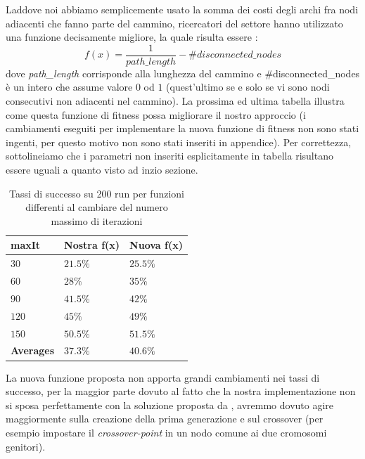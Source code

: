 Laddove noi abbiamo semplicemente usato la somma dei costi degli archi fra nodi adiacenti che fanno parte del cammino, ricercatori del settore hanno utilizzato una funzione decisamente migliore, la quale risulta essere \cite{path2} : $$f(x)=\frac{1}{path\_length}-\#disconnected\_nodes$$ dove \textit{path\_length} corrisponde alla lunghezza del cammino e \#disconnected\_nodes \`e un intero che assume valore $0$ od $1$ (quest'ultimo se e solo se vi sono nodi consecutivi non adiacenti nel cammino).
La prossima ed ultima tabella illustra come questa funzione di fitness possa migliorare il nostro approccio (i cambiamenti eseguiti per implementare la nuova funzione di fitness non sono stati ingenti, per questo motivo non sono stati inseriti in appendice). Per correttezza, sottolineiamo che i parametri non inseriti esplicitamente in tabella risultano essere uguali a quanto visto ad inzio sezione.
\begin{center}
    \begin{table}[H]
        \centering
        \begin{tabular}{|C{3.95cm}C{3.95cm}C{3.95cm}|}
            \hline
            \textbf{maxIt} & \textbf{Nostra f(x)} &\textbf{Nuova f(x)\cite{path2}} \\ \hline
            
             $30$ &  $21.5\%$ &  $25.5\%$ \\
            
            $60$ & $28\%$ & $35\%$ \\
            
             $90$ &  $41.5\%$ &  $42\%$ \\
            
            $120$ & $45\%$ & $49\%$ \\
            
             $150$ &  $50.5\%$ &  $51.5\%$ \\
            
            \hline
            
            \textbf{Averages} & $37.3\%$ & $40.6\%$ \\
            
            \hline
        \end{tabular}
        \caption{Tassi di successo su 200 run per funzioni differenti al cambiare del numero massimo di iterazioni}
        \label{tab:table5}
    \end{table}
\end{center}
La nuova funzione proposta non apporta grandi cambiamenti nei tassi di successo, per la maggior parte dovuto al fatto che la nostra implementazione non si sposa perfettamente con la soluzione proposta da \cite{path2}, avremmo dovuto agire maggiormente sulla creazione della prima generazione e sul crossover (per esempio impostare il \textit{crossover-point} in un nodo comune ai due cromosomi genitori).
\vspace{3mm}

